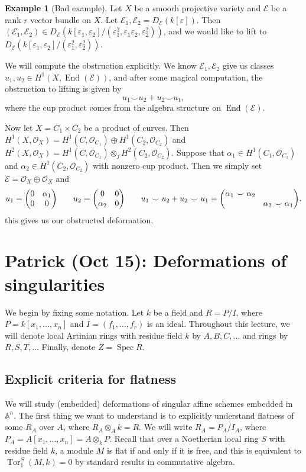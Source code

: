 \documentclass[leqno, openany]{memoir}
\theoremstyle{definition}
\newtheorem{exm}[thm]{Example}
\theoremstyle{remark}
\theoremstyle{plain}
\theoremstyle{definition}
\theoremstyle{remark}
\newcommand{\A}{\mathbb{A}}
\newcommand{\ep}{\varepsilon}
\newcommand{\mc}[1]{\mathcal{#1}}
\DeclareMathOperator{\Tor}{Tor}
\DeclareMathOperator{\End}{End}
\DeclareMathOperator{\Spec}{Spec}
\begin{document}
\begin{exm}[Bad example]
    Let $X$ be a smoorh projective variety and $\mc{E}$ be a rank $r$ vector bundle on $X$. Let $\mc{E}_1, \mc{E}_2 = D_{\mc{E}}(k[\ep])$. Then $(\mc{E}_1, \mc{E}_2) \in D_{\mc{E}}(k[\ep_1, \ep_2] / (\ep_1^2, \ep_1 \ep_2, \ep_2^2))$, and we would like to lift to $D_{\mc{E}}(k[\ep_1, \ep_2]/(\ep_1^2, \ep_2^2))$.

    We will compute the obstruction explicitly. We know $\mc{E}_1, \mc{E}_2$ give us classes $u_1, u_2 \in H^1(X, \End(\mc{E}))$, and after some magical computation, the obstruction to lifting is given by
    \[ u_1 \smile u_2 + u_2 \smile u_1, \]
    where the cup product comes from the algebra structure on $\End(\mc{E})$.

    Now let $X = C_1 \times C_2$ be a product of curves. Then $H^1(X, \mc{O}_X) = H^1(C, \mc{O}_{C_1}) \oplus H^1(C_2, \mc{O}_{C_2})$ and $H^2(X, \mc{O}_X) = H^1(C, \mc{O}_{C_1}) \otimes_j H^2(C_2, \mc{O}_{C_2})$. Suppose that $\alpha_1 \in H^1(C_1, \mc{O}_{C_1})$ and $\alpha_2 \in H^1(C_2, \mc{O}_{C_2})$ with nonzero cup product. Then we simply set $\mc{E} = \mc{O}_X \oplus \mc{O}_X$ and 
    \[ u_1 = \mqty(0 & \alpha_1 \\ 0 & 0) \qquad u_2 = \mqty(0 & 0 \\ \alpha_2 & 0) \qquad u_1 \smile u_2 + u_2 \smile u_1 = \mqty(\dmat{\alpha_1 \smile \alpha_2, \alpha_2 \smile \alpha_1}). \]
    this gives us our obstructed deformation.
\end{exm}

\chapter{Patrick (Oct 15): Deformations of singularities}%
\label{cha:patrick_oct_15_deformations_of_singularities}

We begin by fixing some notation.
Let $k$ be a field and $R = P/I$, where $P = k[x_1, \ldots, x_n]$ and $I = (f_1, \ldots, f_r)$ is an ideal. Throughout this lecture, we will denote local Artinian rings with residue field $k$ by $A,B,C,\ldots$ and rings by $R,S,T,\ldots$ Finally, denote $Z = \Spec R$.

\section{Explicit criteria for flatness}%
\label{sec:explicit_criteria_for_flatness}

We will study (embedded) deformations of singular affine schemes embedded in $\A^n$. The first thing we want to understand is to explicitly understand flatness of some $R_A$ over $A$, where $R_A \otimes_A k = R$. We will write $R_A = P_A / I_A$, where $P_A = A[x_1, \ldots, x_n] = A \otimes_k P$. Recall that over a Noetherian local ring $S$ with residue field $k$, a module $M$ is flat if and only if it is free, and this is equivalent to $\Tor_1^S(M, k) = 0$ by standard results in commutative algebra.
\end{document}
